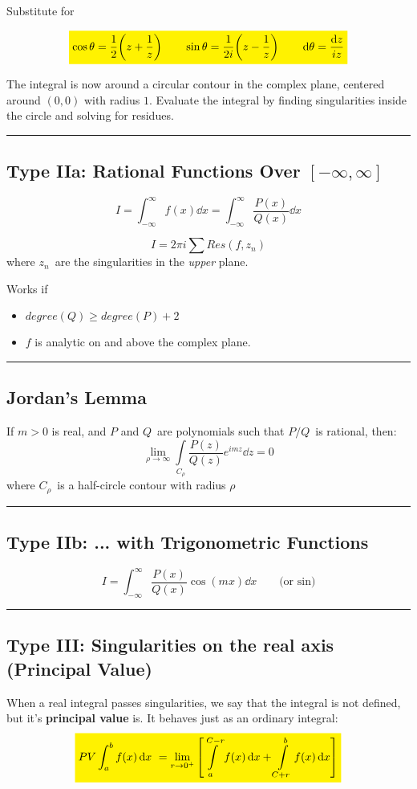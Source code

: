 \documentclass[10pt,a4paper]{article}
\renewcommand{\exp}{e^}
\newcommand{\holine}{\rule{286pt}{1pt}}
\newcommand{\yl}[1]{\colorbox{yellow}{$\displaystyle #1$}}
\begin{document}
\begin{multicols}{2}
Substitute for

\[
\yl{
    \cos{\theta} = \dfrac{1}{2}\qty(z+\dfrac{1}{z}) \quad\quad \sin{\theta} = \dfrac{1}{2i}\qty(z-\dfrac{1}{z}) \quad\quad \dd{\theta} = \dfrac{\dd{z}}{iz}
}
\]

The integral is now around a circular contour in the complex plane, centered around $(0,0)$ with radius $1$. Evaluate the integral by finding singularities inside the circle and solving for residues.




\holine
\subsection*{Type IIa: Rational Functions Over $[-\infty, \infty]$}
\[
    I = \int_{-\infty}^\infty f(x) \dd{x} = \int_{-\infty}^\infty \dfrac{P(x)}{Q(x)} \dd{x}
\]

\[
    I = 2\pi i \sum Res(f, z_n)
\]
where $z_n$ are the singularities in the \textit{upper} plane.


Works if
\begin{itemize}
    \item $degree(Q) \geq degree(P) + 2$
    \item $f$ is analytic on and above the complex plane.
\end{itemize}



\holine
\subsection*{Jordan's Lemma}
If $m>0$ is real, and $P$ and $Q$ are polynomials such that $P/Q$ is rational, then:
\[
    \lim\limits_{\rho\rightarrow\infty}\int\limits_{C_\rho} \frac{P(z)}{Q(z)}\exp{imz} \dd{z} = 0
\]
where $C_\rho$ is a half-circle contour with radius $\rho$



\holine
\subsection*{Type IIb: ... with Trigonometric Functions}
\[
    I = \int_{-\infty}^\infty \dfrac{P(x)}{Q(x)}\cos(m x) \dd{x} \quad\quad \text{(or sin)}
\]



\holine
\subsection*{Type III: Singularities on the real axis (Principal Value)}
When a real integral passes singularities, we say that the integral is not defined, but it's \textbf{principal value} is. It behaves just as an ordinary integral:
\[
\yl{
    PV\int_a^b f(x) \dd{x} = \lim\limits_{r\rightarrow 0^+} \qty[\int\limits_a^{C-r} f(x) \dd{x} + \int\limits_{C+r}^b f(x) \dd{x} ]
}
\]


\end{multicols}
\end{document}
